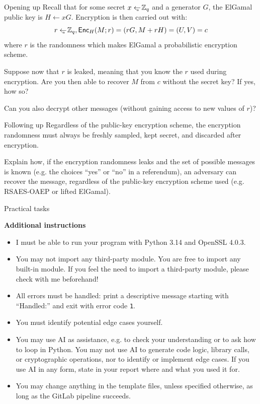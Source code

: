 \documentclass{homework}
\begin{document}
\begin{task}{Opening up}
  Recall that for some secret $x\gets_{\scriptscriptstyle \hspace*{-0.65em} u\hspace*{0.0em}}\mathbb{Z}_q$ and a generator $G$, the ElGamal public key is $H\gets xG$.
  Encryption is then carried out with:
  \[
    r \gets_{\scriptscriptstyle \hspace*{-0.65em} u\hspace*{0.0em}} \mathbb{Z}_q, \mathsf{Enc}_H(M; r) = (rG, M + rH) = (U, V) = c
  \]
  where $r$ is the randomness which makes ElGamal a probabilistic encryption scheme.

  Suppose now that $r$ is leaked, meaning that you know the $r$ used during encryption.
  Are you then able to recover $M$ from $c$ without the secret key?
  If yes, how so?

  Can you also decrypt other messages (without gaining access to new values of $r$)?
\end{task}

\begin{task}{Following up}
  Regardless of the public-key encryption scheme, the encryption randomness must always be freshly sampled, kept secret, and discarded after encryption.

  Explain how, if the encryption randomness leaks and the set of possible messages is known (e.g. the choices \enquote{yes} or \enquote{no} in a referendum), an adversary can recover the message, regardless of the public-key encryption scheme used (e.g. RSAES-OAEP or lifted ElGamal).
\end{task}

\newpage
\setcounter{task}{0}

\begin{center}
  Practical tasks
\end{center}

\textbf{Additional instructions}

\begin{itemize}
  \item I must be able to run your program with Python 3.14 and OpenSSL 4.0.3\footnotemark{}.
  \item You may not import any third-party module.
  You are free to import any built-in module.
  If you feel the need to import a third-party module, please check with me beforehand!
  \item All errors must be handled: print a descriptive message starting with \enquote{Handled:} and exit with error code \texttt{1}.
  \item You must identify potential edge cases yourself.
  \item You may use AI as assistance, e.g. to check your understanding or to ask how to loop in Python.
  You may not use AI to generate code logic, library calls, or cryptographic operations, nor to identify or implement edge cases.
  If you use AI in any form, state in your report where and what you used it for.
  \item You may change anything in the template files, unless specified otherwise, as long as the GitLab pipeline succeeds.
\end{itemize}
\end{document}

